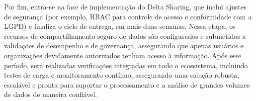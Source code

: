 Por fim, entra-se na fase de implementação do Delta Sharing, que inclui ajustes de segurança (por exemplo, RBAC para controle de acesso e conformidade com a LGPD) e finaliza o ciclo de entrega, em mais duas semanas. Nessa etapa, os recursos de compartilhamento seguro de dados são configurados e submetidos a validações de desempenho e de governança, assegurando que apenas usuários e organizações devidamente autorizados tenham acesso à informação. Após esse período, será realizadas verificações integradas em todo o ecossistema, incluindo testes de carga e monitoramento contínuo, assegurando uma solução robusta, escalável e pronta para suportar o processamento e a análise de grandes volumes de dados de maneira confiável.